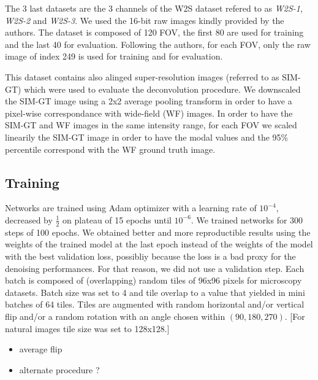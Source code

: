 \documentclass{article}
\begin{document}
The 3 last datasets are the 3 channels of the W2S dataset\cite{zhou2020w2s} refered to as \emph{W2S-1}, \emph{W2S-2} and \emph{W2S-3}. We used the 16-bit raw images kindly provided by the authors. The dataset is composed of 120 FOV, the first 80 are used for training and the last 40 for evaluation. Following the authors, for each FOV, only the raw image of index 249 is used for training and for evaluation.

This dataset contains also alinged super-resolution images (referred to as SIM-GT) which were used to evaluate the deconvolution procedure. We downscaled the SIM-GT image using a 2x2 average pooling transform in order to have a pixel-wise correspondance with wide-field (WF) images. In order to have the SIM-GT and WF images in the same intensity range, for each FOV we scaled linearily the SIM-GT image in order to have the modal values and the 95\% percentile correspond with the WF ground truth image.

\subsection{Training}
Networks are trained using Adam optimizer with a learning rate of $10^{-4}$, decreased by $\frac{1}{2}$ on plateau of 15 epochs until $10^{-6}$. We trained networks for 300 steps of 100 epochs.
We obtained better and more reproductible results using the weights of the trained model at the last epoch instead of the weights of the model with the best validation loss, possibliy because the loss is a bad proxy for the denoising performances. For that reason, we did not use a validation step.
Each batch is composed of (overlapping) random tiles of 96x96 pixels for microscopy datasets. Batch size was set to 4 and tile overlap to a value that yielded in mini batches of 64 tiles. Tiles are augmented with random horizontal and/or vertical flip and/or a random rotation with an angle chosen within $(90, 180, 270)$.
[For natural images tile size was set to 128x128.]
\begin{itemize}
\item average flip
\item alternate procedure ?
\end{itemize}
\end{document}
